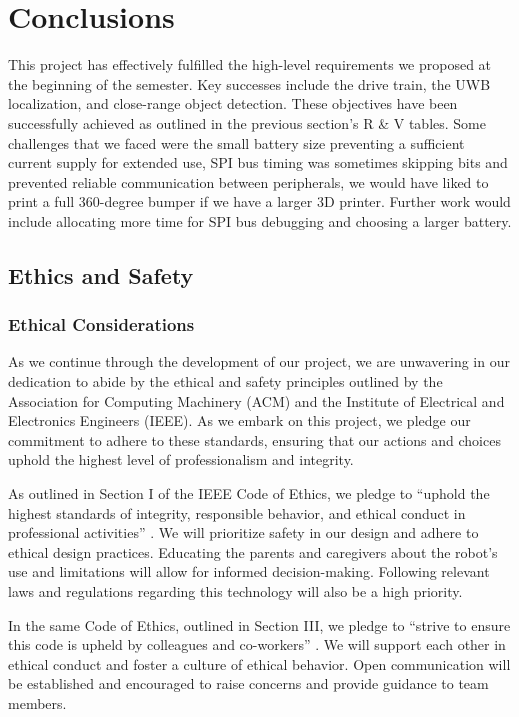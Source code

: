 \documentclass{report}
\begin{document}
    \chapter{Conclusions}

    This project has effectively fulfilled the high-level requirements we proposed at the beginning of the semester. Key successes include the drive train, the UWB localization, and close-range object detection. These objectives have been successfully achieved as outlined in the previous section's R \& V tables. Some challenges that we faced were the small battery size preventing a sufficient current supply for extended use, SPI bus timing was sometimes skipping bits and prevented reliable communication between peripherals, we would have liked to print a full 360-degree bumper if we have a larger 3D printer. Further work would include allocating more time for SPI bus debugging and choosing a larger battery.

    \section{Ethics and Safety}
    \subsection{Ethical Considerations}
    As we continue through the development of our project, we are unwavering in our dedication to abide by the ethical and safety principles outlined by the Association for Computing Machinery (ACM) and the Institute of Electrical and Electronics Engineers (IEEE). As we embark on this project, we pledge our commitment to adhere to these standards, ensuring that our actions and choices uphold the highest level of professionalism and integrity.

    As outlined in Section I of the IEEE Code of Ethics, we pledge to “uphold the highest standards of integrity, responsible behavior, and ethical conduct in professional activities” \cite{IEEE_2020}. We will prioritize safety in our design and adhere to ethical design practices. Educating the parents and caregivers about the robot’s use and limitations will allow for informed decision-making. Following relevant laws and regulations regarding this technology will also be a high priority.

    In the same Code of Ethics, outlined in Section III, we pledge to “strive to ensure this code is upheld by colleagues and co-workers” \cite{IEEE_2020}. We will support each other in ethical conduct and foster a culture of ethical behavior. Open communication will be established and encouraged to raise concerns and provide guidance to team members.
\end{document}
